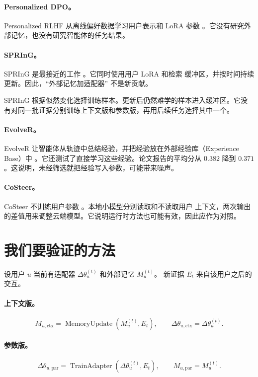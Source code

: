 \documentclass[11pt,UTF8,fontset=fandol]{ctexart}
\newcommand{\adapter}{\Delta\theta_u}
\newcommand{\memory}{M_u}
\begin{document}
\paragraph{Personalized DPO。}
Personalized RLHF 从离线偏好数据学习用户表示和 LoRA 参数
\cite{li2024prlhf}。它没有研究外部记忆，也没有研究智能体的任务结果。

\paragraph{SPRInG。}
SPRInG 是最接近的工作 \cite{kim2026spring}。它同时使用用户 LoRA 和检索
缓冲区，并按时间持续更新。因此，``外部记忆加适配器'' 不是新贡献。

SPRInG 根据似然变化选择训练样本。更新后仍然难学的样本进入缓冲区。它没有对同一批证据分别训练上下文版和参数版，再用后续任务选择其中一个。

\paragraph{EvolveR。}
EvolveR 让智能体从轨迹中总结经验，并把经验放在外部经验库（Experience Base）中
\cite{wu2025evolver}。它还测试了直接学习这些经验。论文报告的平均分从
\(0.382\) 降到 \(0.371\)。这说明，未经筛选就把经验写入参数，可能带来噪声。

\paragraph{CoSteer。}
CoSteer 不训练用户参数 \cite{lv2025costeer}。本地小模型分别读取和不读取用户
上下文，两次输出的差值用来调整云端模型。它说明运行时方法也可能有效，因此应作为对照。

\section{我们要验证的方法}

设用户 \(u\) 当前有适配器 \(\adapter^{(t)}\) 和外部记忆 \(\memory^{(t)}\)。
新证据 \(E_t\) 来自该用户之后的交互。

\paragraph{上下文版。}
\begin{equation}
  M_{u,\mathrm{ctx}}
  =\operatorname{MemoryUpdate}\!\left(\memory^{(t)},E_t\right),
  \qquad
  \Delta\theta_{u,\mathrm{ctx}}=\adapter^{(t)}.
\end{equation}

\paragraph{参数版。}
\begin{equation}
  \Delta\theta_{u,\mathrm{par}}
  =\operatorname{TrainAdapter}\!\left(\adapter^{(t)},E_t\right),
  \qquad
  M_{u,\mathrm{par}}=\memory^{(t)}.
\end{equation}
\end{document}

